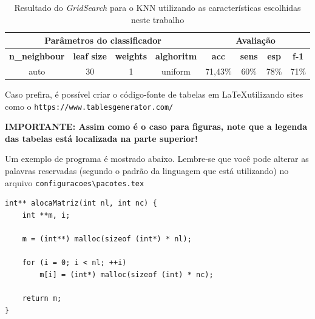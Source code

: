 \begin{table}[!htb]
\centering
\caption{Resultado do \textit{GridSearch} para o KNN utilizando as características escolhidas neste trabalho}
\begin{tabular}{|c|c|c|c|c|c|c|c|}
\hline
\multicolumn{4}{|c|}{Parâmetros do classificador } & \multicolumn{4}{c|}{Avaliação } \\ \hline
\textbf{n\_neighbour}   & \textbf{leaf size} & \textbf{weights} & \textbf{alghoritm} & \textbf{acc} & \textbf{sens} & \textbf{esp} & \textbf{f-1}\\\hline
auto               & 30                 & 1                     & uniform          & 71,43\%           & 60\%                   & 78\%                    & 71\%                     
\\ \hline
\end{tabular}
\label{tab:knn}
\end{table}

Caso prefira, é possível criar o código-fonte de tabelas em \LaTeX utilizando sites como o 
\verb"https://www.tablesgenerator.com/"

\textbf{IMPORTANTE: Assim como é o caso para figuras, note que a legenda das tabelas está localizada na parte superior!}

Um exemplo de programa é mostrado abaixo. Lembre-se que você pode alterar as palavras reservadas (segundo o padrão da linguagem que está utilizando) no arquivo \verb"configuracoes\pacotes.tex"
\begin{lstlisting}
int** alocaMatriz(int nl, int nc) {
    int **m, i;

    m = (int**) malloc(sizeof (int*) * nl);

    for (i = 0; i < nl; ++i)
        m[i] = (int*) malloc(sizeof (int) * nc);

    return m;
}
\end{lstlisting}







